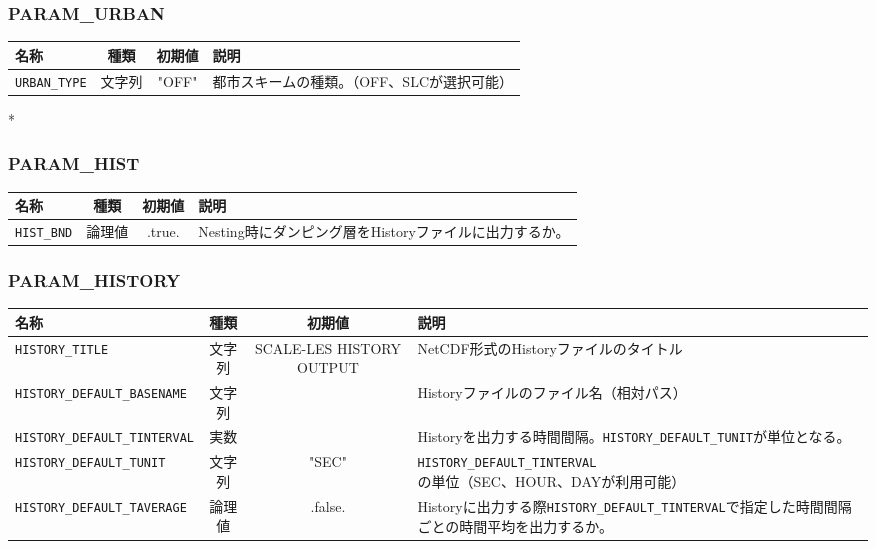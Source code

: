 \subsubsection{PARAM\_URBAN}
\begin{tabularx}{150mm}{|l|c|c|X|} \hline
 \rowcolor[gray]{0.9} 名称 & 種類 & 初期値 & 説明 \\ \hline
 \verb|URBAN_TYPE| & 文字列 & "OFF" & 都市スキームの種類。（OFF、SLCが選択可能）\\ \hline
\end{tabularx}

*
\subsubsection{PARAM\_HIST}
\begin{tabularx}{150mm}{|l|c|c|X|} \hline
 \rowcolor[gray]{0.9} 名称 & 種類 & 初期値 & 説明 \\ \hline
 \verb|HIST_BND| & 論理値 & .true. & Nesting時にダンピング層をHistoryファイルに出力するか。 \\ \hline
\end{tabularx}


\subsubsection{PARAM\_HISTORY}
\begin{tabularx}{150mm}{|l|c|c|X|} \hline
 \rowcolor[gray]{0.9} 名称 & 種類 & 初期値 & 説明 \\ \hline
 \verb|HISTORY_TITLE| & 文字列 & SCALE-LES HISTORY OUTPUT & NetCDF形式のHistoryファイルのタイトル \\ \hline
 \verb|HISTORY_DEFAULT_BASENAME| & 文字列 &  & Historyファイルのファイル名（相対パス） \\ \hline
 \verb|HISTORY_DEFAULT_TINTERVAL| & 実数 &  & Historyを出力する時間間隔。\verb|HISTORY_DEFAULT_TUNIT|が単位となる。 \\ \hline
 \verb|HISTORY_DEFAULT_TUNIT| & 文字列 & "SEC" & \verb|HISTORY_DEFAULT_TINTERVAL|の単位（SEC、HOUR、DAYが利用可能） \\ \hline
 \verb|HISTORY_DEFAULT_TAVERAGE| & 論理値 & .false. & Historyに出力する際\verb|HISTORY_DEFAULT_TINTERVAL|で指定した時間間隔ごとの時間平均を出力するか。 \\ \hline
\end{tabularx}

